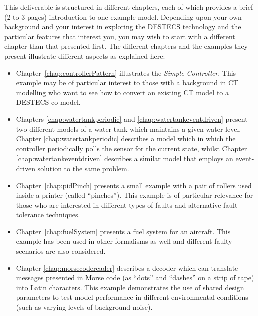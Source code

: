 \documentclass{crescendorepchap}
\begin{document}
This deliverable is structured in different chapters, each of which
provides a brief (2 to 3 pages) introduction to one example model.
Depending upon your own background and your interest in exploring the
DESTECS technology and the particular features that interest you, you
may wish to start with a different chapter than that presented first. The
different chapters and the examples they present illustrate different
aspects as explained here:

\begin{itemize}
\item Chapter~\ref{chap:controllerPattern} illustrates the
  \emph{Simple Controller}.  This example may be of particular
  interest to those with a background in CT modelling who want to see
  how to convert an existing CT model to a DESTECS co-model.
\item Chapters \ref{chap:watertankperiodic} and
  \ref{chap:watertankeventdriven} present two different models of a
  water tank which maintains a given water level.  Chapter
  \ref{chap:watertankperiodic} describes a model which in which the
  controller periodically polls the sensor for the current state,
  whilst Chapter \ref{chap:watertankeventdriven} describes a similar
  model that employs an event-driven solution to the same problem.
\item Chapter~\ref{chap:pidPinch} presents a small example with a pair
  of rollers used inside a printer (called ``pinches''). This example
  is of particular relevance for those who are interested in different
  types of faults and alternative fault tolerance techniques.
\item Chapter~\ref{chap:fuelSystem} presents a fuel system for an
  aircraft. This example has been used in other formalisms as well and
  different faulty scenarios are also considered.
\item Chapter \ref{chap:morsecodereader} describes a decoder which can
  translate messages presented in Morse code (as ``dots'' and
  ``dashes'' on a strip of tape) into Latin characters.  This example
  demonstrates the use of shared design parameters to test model
  performance in different environmental conditions (such as varying
  levels of background noise).

\end{itemize}
\end{document}
